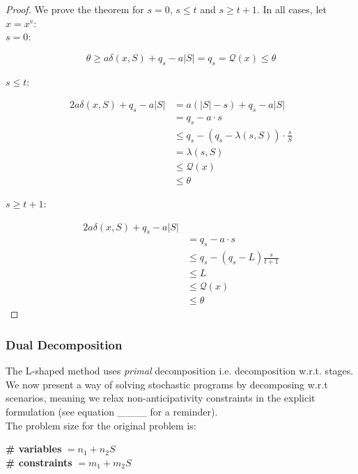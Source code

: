 \begin{proof}
We prove the theorem for $s=0$, $s\leq t$ and $s\geq t+1$. In all cases, let $x=x^v$:\\
$s=0$:

\[
\theta \geq a\delta(x,S) + q_s - a|S| = q_s = \mathscr{Q}(x) \leq \theta
\]

$s\leq t$:

\begin{alignat*}{2}
a\delta(x,S) + q_s - a|S| & =  a(|S|-s) + q_s - a|S|\\
& = q_s - a\cdot s\\
& \leq q_s - (q_s -\lambda(s,S))\cdot \frac{s}{S}\\
& = \lambda(s,S)\\
& \leq \mathscr{Q}(x)\\
& \leq \theta
\end{alignat*}

$s\geq t+1$:

\begin{alignat*}{2}
a\delta(x,S) + q_s - a|S|\\
& = q_s - a\cdot s \\
& \leq q_s - (q_s - L)\frac{s}{t+1} \\
& \leq L \\
& \leq \mathscr{Q}(x)\\
& \leq \theta
\end{alignat*}
\end{proof}

\subsubsection{Dual Decomposition}

The L-shaped method uses \emph{primal} decomposition i.e. decomposition w.r.t. stages.
We now present a way of solving stochastic programs by decomposing w.r.t scenarios,
meaning we relax non-anticipativity constraints in the explicit formulation (see
equation \_\_\_\_ for a reminder).\\

The problem size for the original problem is:\\

\hspace{2cm} \textbf{\# variables} $ = n_1 + n_2S$\\

\hspace{2cm}\textbf{\# constraints} $ = m_1 + m_2S$\\

